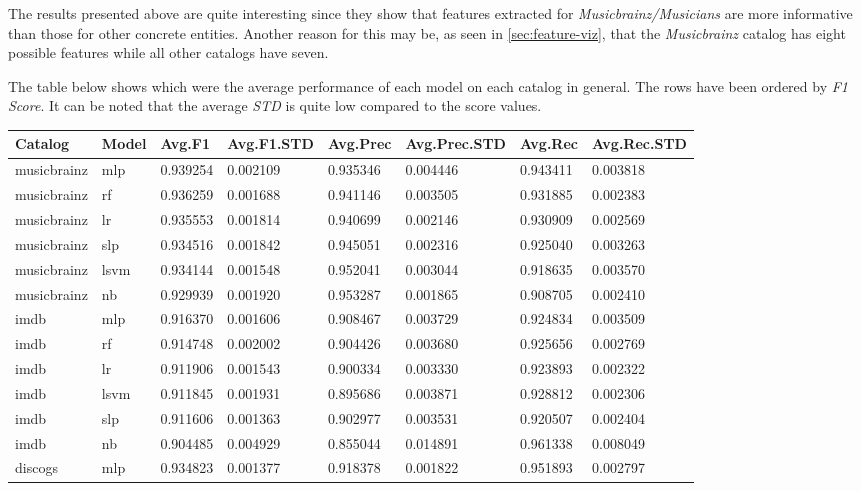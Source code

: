 \documentclass[epsfig,a4paper,11pt,titlepage,twoside,openany]{book}
\begin{document}
The results presented above are quite interesting since they show that features extracted for \textit{Musicbrainz/Musicians} are more informative than those for other concrete entities. Another reason for this may be, as seen in \autoref{sec:feature-viz}, that the \textit{Musicbrainz} catalog has eight possible features while all other catalogs have seven. 

The table below shows which were the average performance of each model on each catalog in general. The rows have been ordered by \textit{F1 Score}. It can be noted that the average \textit{STD} is quite low compared to the score values. 

\begin{longtable}{|l|l|l|l|l|l|l|l|}
\hline
Catalog     & Model & Avg.F1   & Avg.F1.STD & Avg.Prec & Avg.Prec.STD & Avg.Rec  & Avg.Rec.STD \\ \hline
musicbrainz & mlp   & 0.939254 & 0.002109   & 0.935346 & 0.004446     & 0.943411 & 0.003818    \\
musicbrainz & rf    & 0.936259 & 0.001688   & 0.941146 & 0.003505     & 0.931885 & 0.002383    \\
musicbrainz & lr    & 0.935553 & 0.001814   & 0.940699 & 0.002146     & 0.930909 & 0.002569    \\
musicbrainz & slp   & 0.934516 & 0.001842   & 0.945051 & 0.002316     & 0.925040 & 0.003263    \\
musicbrainz & lsvm  & 0.934144 & 0.001548   & 0.952041 & 0.003044     & 0.918635 & 0.003570    \\
musicbrainz & nb    & 0.929939 & 0.001920   & 0.953287 & 0.001865     & 0.908705 & 0.002410    \\ \hline
imdb        & mlp   & 0.916370 & 0.001606   & 0.908467 & 0.003729     & 0.924834 & 0.003509    \\
imdb        & rf    & 0.914748 & 0.002002   & 0.904426 & 0.003680     & 0.925656 & 0.002769    \\
imdb        & lr    & 0.911906 & 0.001543   & 0.900334 & 0.003330     & 0.923893 & 0.002322    \\
imdb        & lsvm  & 0.911845 & 0.001931   & 0.895686 & 0.003871     & 0.928812 & 0.002306    \\
imdb        & slp   & 0.911606 & 0.001363   & 0.902977 & 0.003531     & 0.920507 & 0.002404    \\
imdb        & nb    & 0.904485 & 0.004929   & 0.855044 & 0.014891     & 0.961338 & 0.008049    \\ \hline
discogs     & mlp   & 0.934823 & 0.001377   & 0.918378 & 0.001822     & 0.951893 & 0.002797    \\

\end{longtable}
\end{document}
